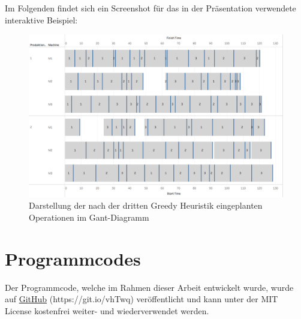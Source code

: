 \documentclass[final, english, ngerman, a4paper, 12pt, %
numbers=noenddot,
cd=true,
cdfont=false,cdfont=nohead,cdfont=nodin,
cdmath=false,
cdhead=false,
cdfoot=true,
cdcover=monochrome,
cdgeometry=symmetric,
declaration=heading,
declaration=notoc,
abstract=heading,
]{tudscrreprt}
\begin{document}
\noindent
Im Folgenden findet sich ein Screenshot für das in der Präsentation verwendete interaktive Beispiel:
\begin{figure}[H]
	\centering
	\includegraphics[width=\textwidth]{./settings/gh3}
	\caption[Interaktives Beispiel - Einplanung nach der dritten Greedy Heuristik]{Darstellung der nach der dritten Greedy Heuristik eingeplanten Operationen im Gant-Diagramm\footnotemark}\label{fig:gh3}
\end{figure}

\appendix

\chapter{Programmcodes}
Der Programmcode, welche im Rahmen dieser Arbeit entwickelt wurde, wurde auf \href{https://git.io/vhTwq}{GitHub} (https://git.io/vhTwq) veröffentlicht und kann unter der MIT License kostenfrei weiter- und wiederverwendet werden.


\clearpage

\printbibliography

\end{document}
